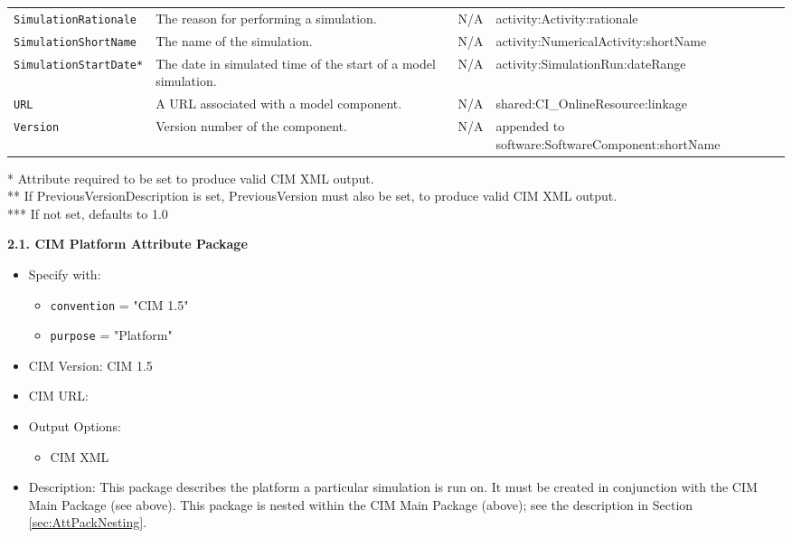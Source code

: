 \begin{longtable}{|p{6cm}|p{2cm}|p{1.5cm}|p{6.5cm}|}
     {\tt SimulationRationale} & The reason for performing a simulation. & N/A  & activity:Activity:rationale \\
     {\tt SimulationShortName} & The name of the simulation. & N/A & activity:NumericalActivity:shortName \\
     {\tt SimulationStartDate*} & The date in simulated time of the start of a model simulation. & N/A & activity:SimulationRun:dateRange \\
     {\tt URL} & A URL associated with a model component. & N/A & shared:CI\_OnlineResource:linkage \\
     {\tt Version} & Version number of the component. & N/A  & appended to software:SoftwareComponent:shortName \\
     \hline\hline
\end{longtable}
 * Attribute required to be set to produce valid CIM XML output. \\
 ** If PreviousVersionDescription is set, PreviousVersion must also be set, to produce valid CIM XML output. \\
 *** If not set, defaults to 1.0

\vspace{.20in}

{\bf 2.1. CIM Platform Attribute Package}

\begin{itemize}
    \item Specify with:
    \begin{itemize}
        \item {\tt convention} = "CIM 1.5"
        \item {\tt purpose} = "Platform"
    \end{itemize}
    \item CIM Version: CIM 1.5
    \item CIM URL: 
    \item Output Options:
    \begin{itemize}
       \item CIM XML
    \end{itemize}
    \item Description: This package describes the platform a particular simulation is run on. It must be created in conjunction with the CIM Main Package (see above). This package is nested within the CIM Main Package (above); see the description in Section \ref{sec:AttPackNesting}.
\end{itemize}

